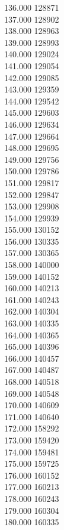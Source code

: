 { 136.000	128871 \\
 137.000	128902 \\
 138.000	128963 \\
 139.000	128993 \\
 140.000	129024 \\
 141.000	129054 \\
 142.000	129085 \\
 143.000	129359 \\
 144.000	129542 \\
 145.000	129603 \\
 146.000	129634 \\
 147.000	129664 \\
 148.000	129695 \\
 149.000	129756 \\
 150.000	129786 \\
 151.000	129817 \\
 152.000	129847 \\
 153.000	129908 \\
 154.000	129939 \\
 155.000	130152 \\
 156.000	130335 \\
 157.000	130365 \\
 158.000	140000 \\
 159.000	140152 \\
 160.000	140213 \\
 161.000	140243 \\
 162.000	140304 \\
 163.000	140335 \\
 164.000	140365 \\
 165.000	140396 \\
 166.000	140457 \\
 167.000	140487 \\
 168.000	140518 \\
 169.000	140548 \\
 170.000	140609 \\
 171.000	140640 \\
 172.000	158292 \\
 173.000	159420 \\
 174.000	159481 \\
 175.000	159725 \\
 176.000	160152 \\
 177.000	160213 \\
 178.000	160243 \\
 179.000	160304 \\
 180.000	160335 \\
}
